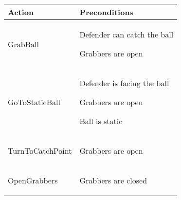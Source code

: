 \begin{center}

\renewcommand{\arraystretch}{1.5}
\begin{tabular}{ | >{\centering\arraybackslash}m{42mm} | >{\centering\arraybackslash}p{110mm} | }
\hline
\textbf{Action} & \textbf{Preconditions} \\ \hline
GrabBall &
\begin{compactitem}
\item Defender can catch the ball
\item Grabbers are open
\end{compactitem}  \\ \hline

GoToStaticBall &
\begin{compactitem}
\item Defender is facing the ball
\item Grabbers are open
\item Ball is static
\end{compactitem}  \\ \hline

TurnToCatchPoint &
\begin{compactitem}
\item Grabbers are open
\end{compactitem}  \\ \hline

OpenGrabbers &
\begin{compactitem}
\item Grabbers are closed
\end{compactitem}  \\ \hline

\end{tabular}
\par
\bigskip

\end{center}
